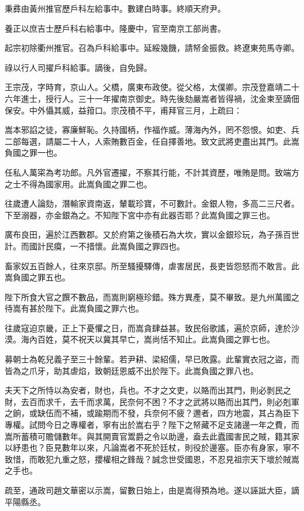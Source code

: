 \begin{pinyinscope}
秉彞由黃州推官歷戶科左給事中。數建白時事。終順天府尹。

養正以庶吉士歷戶科右給事中。隆慶中，官至南京工部尚書。

起宗初除衢州推官。召為戶科給事中。延綏幾饑，請帑金振救。終遼東苑馬寺卿。

祿以行人司擢戶科給事。謫後，自免歸。

王宗茂，字時育，京山人。父橋，廣東布政使。從父格，太僕卿。宗茂登嘉靖二十六年進士，授行人。三十一年擢南京御史。時先後劾嚴嵩者皆得禍，沈金柬至謫佃保安。中外懾其威，益箝口。宗茂積不平，甫拜官三月，上疏曰：

嵩本邪諂之徒，寡廉鮮恥。久持國柄，作福作威。薄海內外，罔不怨恨。如吏、兵二部每選，請屬二十人，人索賄數百金，任自擇善地。致文武將吏盡出其門。此嵩負國之罪一也。

任私人萬寀為考功郎。凡外官遷擢，不察其行能，不計其資歷，唯賄是問。致端方之士不得為國家用。此嵩負國之罪二也。

往歲遭人論劾，潛輸家資南返，輦載珍寶，不可數計。金銀人物，多高二三尺者。下至溺器，亦金銀為之。不知陛下宮中亦有此器否耶？此嵩負國之罪三也。

廣布良田，遍於江西數郡。又於府第之後積石為大坎，實以金銀珍玩，為子孫百世計。而國計民瘼，一不措懷。此嵩負國之罪四也。

畜家奴五百餘人，往來京邸。所至騷擾驛傳，虐害居民，長吏皆怨怒而不敢言。此嵩負國之罪五也。

陛下所食大官之饌不數品，而嵩則窮極珍錯。殊方異產，莫不畢致。是九州萬國之待嵩有甚於陛下。此嵩負國之罪六也。

往歲寇迫京畿，正上下憂懼之日，而嵩貪肆益甚。致民俗歌謠，遍於京師，達於沙漠。海內百姓，莫不祝天以冀其早亡，嵩尚恬不知止。此嵩負國之罪七也。

募朝士為乾兒義子至三十餘輩。若尹耕、梁紹儒，早已敗露。此輩實衣冠之盜，而皆為之爪牙，助其虐焰，致朝廷恩威不出於陛下。此嵩負國之罪八也。

夫天下之所恃以為安者，財也，兵也。不才之文吏，以賂而出其門，則必剝民之財，去百而求千，去千而求萬，民奈何不困？不才之武將以賂而出其門，則必剋軍之餉，或缺伍而不補，或踰期而不發，兵奈何不疲？邇者，四方地震，其占為臣下專權。試問今日之專權者，寧有出於嵩右乎？陛下之帑藏不足支諸邊一年之費，而嵩所蓄積可贍儲數年。與其開賣官鬻爵之令以助邊，盍去此蠹國害民之賊，籍其家以紓患也？臣見數年以來，凡論嵩者不死於廷杖，則役於邊塞。臣亦有身家，寧不致惜，而敢犯九重之怒，攖權相之鋒哉？誠念世受國恩，不忍見祖宗天下壞於賊嵩之手也。

疏至，通政司趙文華密以示嵩，留數日始上，由是嵩得預為地。遂以誣詆大臣，謫平陽縣丞。


\end{pinyinscope}
